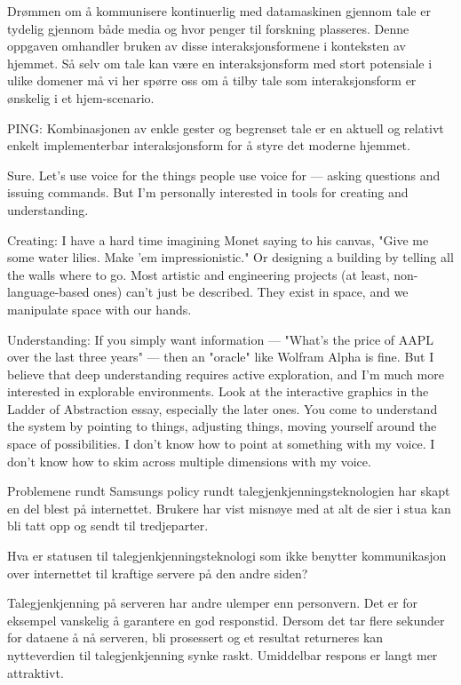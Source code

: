 Drømmen om å kommunisere kontinuerlig med datamaskinen gjennom tale er tydelig gjennom både media og hvor penger til forskning plasseres. Denne oppgaven omhandler bruken av disse interaksjonsformene i konteksten av hjemmet. Så selv om tale kan være en interaksjonsform med stort potensiale i ulike domener må vi her spørre oss om å tilby tale som interaksjonsform er ønskelig i et hjem-scenario. 

{\color{red}PING: Kombinasjonen av enkle gester og begrenset tale er en aktuell og relativt enkelt implementerbar interaksjonsform for å styre det moderne hjemmet.}

Sure. Let's use voice for the things people use voice for — asking questions and issuing commands. But I'm personally interested in tools for creating and understanding.

Creating: I have a hard time imagining Monet saying to his canvas, "Give me some water lilies. Make 'em impressionistic." Or designing a building by telling all the walls where to go. Most artistic and engineering projects (at least, non-language-based ones) can't just be described. They exist in space, and we manipulate space with our hands.

Understanding: If you simply want information — "What's the price of AAPL over the last three years" — then an "oracle" like Wolfram Alpha is fine. But I believe that deep understanding requires active exploration, and I'm much more interested in explorable environments. Look at the interactive graphics in the Ladder of Abstraction essay, especially the later ones. You come to understand the system by pointing to things, adjusting things, moving yourself around the space of possibilities. I don't know how to point at something with my voice. I don't know how to skim across multiple dimensions with my voice.




Problemene rundt Samsungs policy rundt talegjenkjenningsteknologien har skapt en del blest på internettet. Brukere har vist misnøye med at alt de sier i stua kan bli tatt opp og sendt til tredjeparter. 

Hva er statusen til talegjenkjenningsteknologi som ikke benytter kommunikasjon over internettet til kraftige servere på den andre siden?  

Talegjenkjenning på serveren har andre ulemper enn personvern. Det er for eksempel vanskelig å garantere en god responstid. Dersom det tar flere sekunder for dataene å nå serveren, bli prosessert og et resultat returneres kan nytteverdien til talegjenkjenning synke raskt. Umiddelbar respons er langt mer attraktivt.

